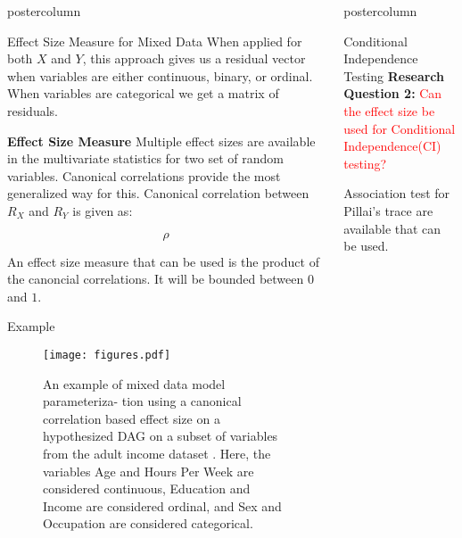 \documentclass{beamer}
\newlength{\columnheight}
\begin{document}
\begin{frame}
\begin{columns}
\begin{column}{.33\textwidth}
\begin{beamercolorbox}[center]{postercolumn}
\begin{minipage}{.98\textwidth}
{\begin{myblock}{Effect Size Measure for Mixed Data}
		When applied for both $ X $ and $ Y $, this approach gives us a
		residual vector when variables are either continuous, binary,
		or ordinal. When variables are categorical we get a matrix of
		residuals.
		
		\textbf{Effect Size Measure}
		Multiple effect sizes are available in the multivariate statistics for two set of random variables. Canonical 
		correlations provide the most generalized way for this. Canonical correlation between $ R_X $ and $ R_Y $ is given
		as:

		$$ \rho $$

		An effect size measure that can be used is the product of the canoncial correlations. It will be bounded between $ 0 $ and $ 1 $.
	\end{myblock}\vfill
	\begin{myblock}{Example}
		\begin{figure}
			\texttt{[image: figures.pdf]}
			\caption{An example of mixed data model parameteriza-
				tion using a canonical correlation based effect
				size on a hypothesized DAG on a subset of
				variables from the adult income dataset \citep{kohavi1996}.
				Here, the variables Age and
				Hours Per Week are considered continuous,
				Education and Income are considered ordinal,
				and Sex and Occupation are considered categorical.
			}
		\end{figure}
	\end{myblock}
		}\end{minipage}\end{beamercolorbox}
	\end{column}


	\begin{column}{0.33\textwidth}
		\begin{beamercolorbox}[center]{postercolumn}
			\begin{minipage}{.98\textwidth} %
				\parbox[t][\columnheight]{\textwidth}{ %
	\begin{myblock}{Conditional Independence Testing}
		\textbf{Research Question 2:} \textcolor{red}{Can the effect size be used for Conditional Independence(CI) testing?}

		Association test for Pillai's trace are available that can be used.


\end{myblock}}
\end{minipage}
\end{beamercolorbox}
\end{column}
\end{columns}
\end{frame}
\end{document}
